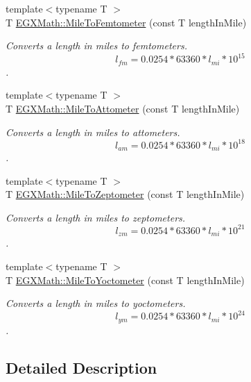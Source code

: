 \begin{DoxyCompactItemize}
{\footnotesize template$<$typename T $>$ }\\T \mbox{\hyperlink{group___e_g_x_math-_conversions-_length_conversions-_imperial-_mile-_s_i_ga760e3af0fd7e18bf8ece567008891e42}{E\+G\+X\+Math\+::\+Mile\+To\+Femtometer}} (const T length\+In\+Mile)
\begin{DoxyCompactList}\small\item\em Converts a length in miles to femtometers. \[ l_{fm}=0.0254 * 63360 * l_{mi} * 10^{15} \]. \end{DoxyCompactList}\item 
{\footnotesize template$<$typename T $>$ }\\T \mbox{\hyperlink{group___e_g_x_math-_conversions-_length_conversions-_imperial-_mile-_s_i_gafcc088753cafd9bf783abc87dd37a8d9}{E\+G\+X\+Math\+::\+Mile\+To\+Attometer}} (const T length\+In\+Mile)
\begin{DoxyCompactList}\small\item\em Converts a length in miles to attometers. \[ l_{am}=0.0254 * 63360 * l_{mi} * 10^{18} \]. \end{DoxyCompactList}\item 
{\footnotesize template$<$typename T $>$ }\\T \mbox{\hyperlink{group___e_g_x_math-_conversions-_length_conversions-_imperial-_mile-_s_i_gaa9bfa89d95751e47208d10259bc7ac9c}{E\+G\+X\+Math\+::\+Mile\+To\+Zeptometer}} (const T length\+In\+Mile)
\begin{DoxyCompactList}\small\item\em Converts a length in miles to zeptometers. \[ l_{zm}=0.0254 * 63360 * l_{mi} * 10^{21} \]. \end{DoxyCompactList}\item 
{\footnotesize template$<$typename T $>$ }\\T \mbox{\hyperlink{group___e_g_x_math-_conversions-_length_conversions-_imperial-_mile-_s_i_ga828eb49720729eca76e81999b0565959}{E\+G\+X\+Math\+::\+Mile\+To\+Yoctometer}} (const T length\+In\+Mile)
\begin{DoxyCompactList}\small\item\em Converts a length in miles to yoctometers. \[ l_{ym}=0.0254 * 63360 * l_{mi} * 10^{24} \]. \end{DoxyCompactList}\end{DoxyCompactItemize}


\subsection{Detailed Description}


